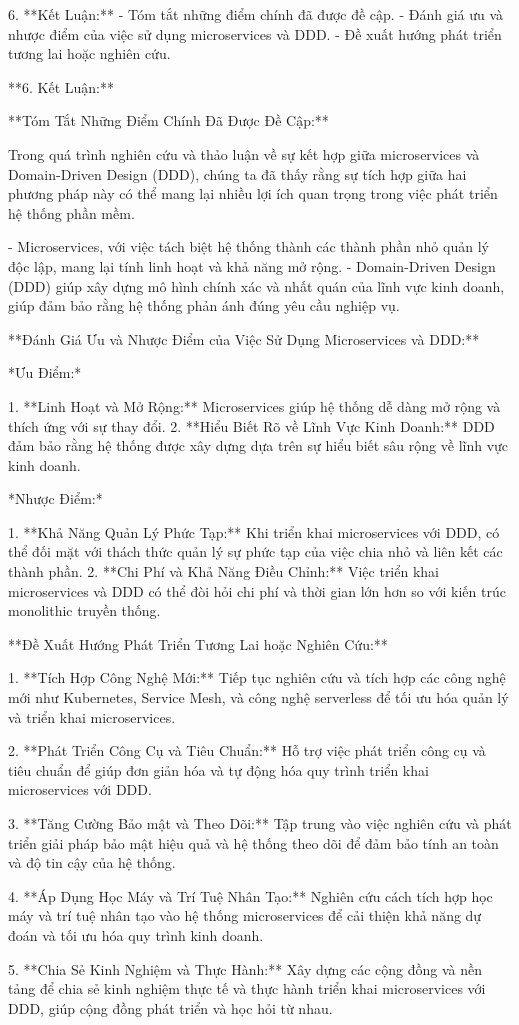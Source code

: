 

6. **Kết Luận:**
- Tóm tắt những điểm chính đã được đề cập.
- Đánh giá ưu và nhược điểm của việc sử dụng microservices và DDD.
- Đề xuất hướng phát triển tương lai hoặc nghiên cứu.







**6. Kết Luận:**

**Tóm Tắt Những Điểm Chính Đã Được Đề Cập:**

Trong quá trình nghiên cứu và thảo luận về sự kết hợp giữa microservices và Domain-Driven Design (DDD), chúng ta đã thấy rằng sự tích hợp giữa hai phương pháp này có thể mang lại nhiều lợi ích quan trọng trong việc phát triển hệ thống phần mềm.

- Microservices, với việc tách biệt hệ thống thành các thành phần nhỏ quản lý độc lập, mang lại tính linh hoạt và khả năng mở rộng.
- Domain-Driven Design (DDD) giúp xây dựng mô hình chính xác và nhất quán của lĩnh vực kinh doanh, giúp đảm bảo rằng hệ thống phản ánh đúng yêu cầu nghiệp vụ.

**Đánh Giá Ưu và Nhược Điểm của Việc Sử Dụng Microservices và DDD:**

*Ưu Điểm:*

1. **Linh Hoạt và Mở Rộng:** Microservices giúp hệ thống dễ dàng mở rộng và thích ứng với sự thay đổi.
2. **Hiểu Biết Rõ về Lĩnh Vực Kinh Doanh:** DDD đảm bảo rằng hệ thống được xây dựng dựa trên sự hiểu biết sâu rộng về lĩnh vực kinh doanh.

*Nhược Điểm:*

1. **Khả Năng Quản Lý Phức Tạp:** Khi triển khai microservices với DDD, có thể đối mặt với thách thức quản lý sự phức tạp của việc chia nhỏ và liên kết các thành phần.
2. **Chi Phí và Khả Năng Điều Chỉnh:** Việc triển khai microservices và DDD có thể đòi hỏi chi phí và thời gian lớn hơn so với kiến trúc monolithic truyền thống.

**Đề Xuất Hướng Phát Triển Tương Lai hoặc Nghiên Cứu:**

1. **Tích Hợp Công Nghệ Mới:** Tiếp tục nghiên cứu và tích hợp các công nghệ mới như Kubernetes, Service Mesh, và công nghệ serverless để tối ưu hóa quản lý và triển khai microservices.

2. **Phát Triển Công Cụ và Tiêu Chuẩn:** Hỗ trợ việc phát triển công cụ và tiêu chuẩn để giúp đơn giản hóa và tự động hóa quy trình triển khai microservices với DDD.

3. **Tăng Cường Bảo mật và Theo Dõi:** Tập trung vào việc nghiên cứu và phát triển giải pháp bảo mật hiệu quả và hệ thống theo dõi để đảm bảo tính an toàn và độ tin cậy của hệ thống.

4. **Áp Dụng Học Máy và Trí Tuệ Nhân Tạo:** Nghiên cứu cách tích hợp học máy và trí tuệ nhân tạo vào hệ thống microservices để cải thiện khả năng dự đoán và tối ưu hóa quy trình kinh doanh.

5. **Chia Sẻ Kinh Nghiệm và Thực Hành:** Xây dựng các cộng đồng và nền tảng để chia sẻ kinh nghiệm thực tế và thực hành triển khai microservices với DDD, giúp cộng đồng phát triển và học hỏi từ nhau.



